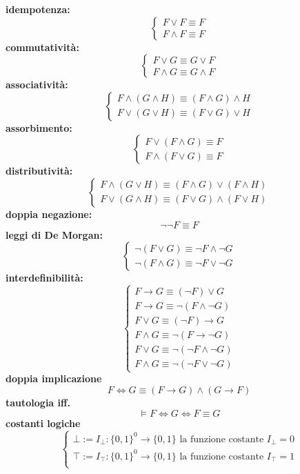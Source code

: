 \noindent
\textbf{idempotenza:} 
$$
\begin{cases}
  F \lor F \equiv F \\
  F \land F \equiv F
\end{cases}
$$
\noindent 
\textbf{commutatività:}
$$
\begin{cases}
  F \lor G \equiv G \lor F \\
  F \land G \equiv G \land F 
\end{cases}
$$
\noindent 
\textbf{associatività:}
$$
\begin{cases}
  F \land (G \land H) \equiv (F \land G) \land H \\
  F \lor (G \lor H) \equiv (F \lor G) \lor H 
\end{cases}
$$
\noindent 
\textbf{assorbimento:}
$$
\begin{cases}
  F \lor (F \land G) \equiv F \\
  F \land (F\lor G) \equiv F 
\end{cases}
$$
\noindent 
\textbf{distributività:}
$$
\begin{cases}
  F \land (G \lor H) \equiv (F \land G) \lor (F \land H) \\
  F \lor (G \land H) \equiv (F \lor G) \land (F \lor H)
\end{cases}
$$
\noindent 
\textbf{doppia negazione:}
$$
\neg\neg F \equiv F 
$$
\noindent 
\textbf{leggi di De Morgan:}
$$
\begin{cases}
  \neg (F \lor G) \equiv \neg F \land \neg G \\
  \neg (F \land G) \equiv \neg F \lor \neg G 
\end{cases}
$$
\noindent 
\textbf{interdefinibilità:}
$$
\begin{cases}
  F \rightarrow G \equiv  (\neg F) \lor G \\
  F \rightarrow G \equiv \neg(F \land \neg G) \\
  F \lor G \equiv (\neg F) \rightarrow G \\
  F \land G \equiv \neg(F \rightarrow \neg G) \\
  F \lor G \equiv \neg (\neg F \land \neg G) \\
  F \land G \equiv \neg(\neg F \lor \neg G)
\end{cases}
$$
\noindent 
\textbf{doppia implicazione}
$$
F \iff G \equiv (F \rightarrow G) \land (G \rightarrow F)
$$
\noindent
\textbf{tautologia iff.}
$$
\models F \iff G \iff F \equiv G
$$
\noindent 
\textbf{costanti logiche}
$$
\begin{cases}
  \bot :=  I_{\bot} : \{0,1\}^0 \rightarrow \{0,1\} \text{ la funzione costante } I_{\bot} =  0 \\
  \top :=  I_{\top} : \{0,1\}^0 \rightarrow \{0,1\} \text{ la funzione costante } I_{\top} =  1 \\
\end{cases}
$$
